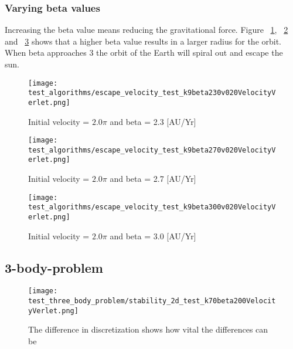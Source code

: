 \subsubsection{Varying beta values}

Increasing the beta value means reducing the gravitational force. Figure ~\ref{fig:Earth_sun_jupiter_beta_230_v0_2.0_pi}, ~\ref{fig:Earth_sun_jupiter_beta_270_v0_2.0_pi} and ~\ref{fig:Earth_sun_jupiter_beta_300_v0_2.0_pi} shows that a higher beta value results in a larger radius for the orbit. When beta approaches 3 the orbit of the Earth will spiral out and escape the sun.

\FloatBarrier
\begin{figure}[!ht]
\centering
\FloatBarrier
\texttt{[image: test\_algorithms/escape\_velocity\_test\_k9beta230v020VelocityVerlet.png]}

\caption{Initial velocity = $2.0\pi$ and beta = 2.3 [AU/Yr]}
\label{fig:Earth_sun_jupiter_beta_230_v0_2.0_pi}
\end{figure}
\FloatBarrier

\FloatBarrier
\begin{figure}[!ht]
\centering
\FloatBarrier
\texttt{[image: test\_algorithms/escape\_velocity\_test\_k9beta270v020VelocityVerlet.png]}

\caption{Initial velocity = $2.0\pi$ and beta = 2.7 [AU/Yr]}
\label{fig:Earth_sun_jupiter_beta_270_v0_2.0_pi}
\end{figure}
\FloatBarrier

\FloatBarrier
\begin{figure}[!ht]
\centering
\FloatBarrier
\texttt{[image: test\_algorithms/escape\_velocity\_test\_k9beta300v020VelocityVerlet.png]}

\caption{Initial velocity = $2.0\pi$ and beta = 3.0 [AU/Yr]}
\label{fig:Earth_sun_jupiter_beta_300_v0_2.0_pi}
\end{figure}
\FloatBarrier


\subsection{3-body-problem}

\FloatBarrier
\begin{figure}[!ht]
\centering
\FloatBarrier
\texttt{[image: test\_three\_body\_problem/stability\_2d\_test\_k70beta200VelocityVerlet.png]}

\caption{The difference in discretization shows how vital the differences can be}
\label{fig:Earth_orbit_sun_Forward_Euler_k_8}
\end{figure}
\FloatBarrier

